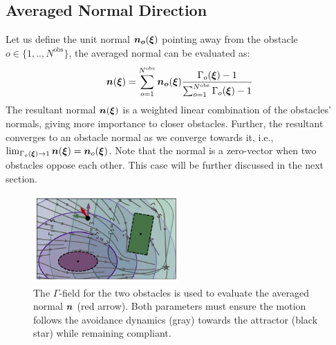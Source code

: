 \documentclass[conference]{IEEEtran}
\begin{document}
\subsection{Averaged Normal Direction} \label{sec:obstacle_normals}
Let us define the unit normal $\boldsymbol{n_o} (\boldsymbol{\xi})$  pointing away from the obstacle $o \in \{1,  ..,  N^{\mathrm{obs}} \}$, the averaged normal can be evaluated as:
\begin{equation}
  \boldsymbol{n}(\boldsymbol{\xi}) = \sum_{o=1}^{N^{\mathrm{obs}}} \boldsymbol{n_o}(\boldsymbol{\xi})
  \frac{\Gamma_o(\boldsymbol{\xi}) - 1}{\sum_{o=1}^{N^\mathrm{obs}} \Gamma_o(\boldsymbol{\xi}) - 1}
\end{equation}
The resultant normal $\boldsymbol{n}(\boldsymbol{\xi})$ is a weighted linear combination of the obstacles' normals, giving more importance to closer obstacles.
Further, the resultant converges to an obstacle normal as we converge towards it, i.e., $\lim_{\Gamma_o(\boldsymbol{\xi}) \rightarrow 1} \boldsymbol{n}(\boldsymbol{\xi}) = \boldsymbol{n}_o(\boldsymbol{\xi})$.
Note that the normal is a zero-vector when two obstacles oppose each other. This case will be further discussed in the next section.

\begin{figure}
\centerline{\includegraphics[width=0.5\textwidth]{figures/normal_and_gamma_field_visualization}}
\caption{The $\Gamma$-field for the two obstacles is used to evaluate the averaged normal $\boldsymbol{n}$ (red arrow). 
Both parameters must ensure the motion follows the avoidance dynamics (gray) towards the attractor (black star) while remaining compliant.}
\label{fig:resultant_normal}
\end{figure}
\end{document}
